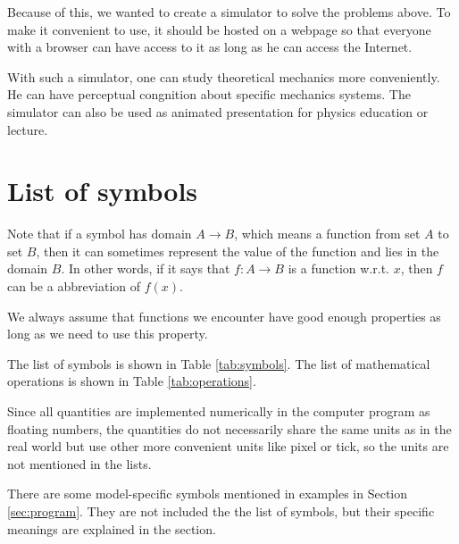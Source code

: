 \documentclass[12pt]{article}
\begin{document}
Because of this, we wanted to create a simulator to solve the problems above.
To make it convenient to use, it should be hosted on a webpage
so that everyone with a browser can have access to it as long as he can access the Internet.

With such a simulator, one can study theoretical mechanics more conveniently.
He can have perceptual congnition about specific mechanics systems.
The simulator can also be used as animated presentation for physics education or lecture.

\section{List of symbols}

Note that if a symbol has domain $A\rightarrow B$,
which means a function from set $A$ to set $B$,
then it can sometimes represent the value of the function
and lies in the domain $B$.
In other words, if it says that $f:A\rightarrow B$ is a function w.r.t. $x$,
then $f$ can be a abbreviation of $f\left(x\right)$.

We always assume that functions we encounter have good enough properties as long as we need to use this property.

The list of symbols is shown in Table \ref{tab:symbols}.
The list of mathematical operations is shown in Table \ref{tab:operations}.

Since all quantities are implemented numerically in the computer program as floating numbers,
the quantities do not necessarily share the same units as in the real world
but use other more convenient units like pixel or tick,
so the units are not mentioned in the lists.

There are some model-specific symbols mentioned in examples in Section \ref{sec:program}.
They are not included the the list of symbols, but their specific meanings are explained in the section.
\end{document}
